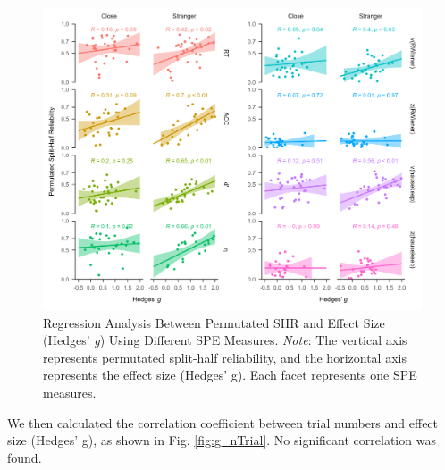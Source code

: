 \documentclass[sn-apa]{sn-jnl}%
\theoremstyle{thmstyleone}%
\theoremstyle{thmstyletwo}%
\theoremstyle{thmstylethree}%
\begin{document}
\begin{figure}[!ht]
	\centering
	\includegraphics[width=1\textwidth]{./Figure/Fig8_yi&r.png}
	\caption[Regression Analysis Between Permutated SHR and Effect Size (Hedges’ \textit{g}) Using Different SPE Measures.]{Regression Analysis Between Permutated SHR and Effect Size (Hedges’ \textit{g}) Using Different SPE Measures. \textit{Note}: The vertical axis represents permutated split-half reliability, and the horizontal axis represents the effect size (Hedges’ g). Each facet represents one SPE measures.
	}\label{fig:g_r}
\end{figure}
\clearpage

We then calculated the correlation coefficient between trial numbers and effect size (Hedges’ g), as shown in Fig. \ref{fig:g_nTrial}. No significant correlation was found. 
\end{document}
